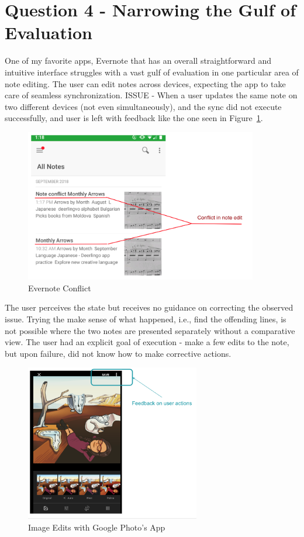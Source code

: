 \documentclass[12pt,letterpaper]{article}
\begin{document}
\section*{Question 4 - Narrowing the Gulf of Evaluation}
One of my favorite apps, Evernote \cite{evernote} that has an overall straightforward and intuitive interface struggles with a vast gulf of evaluation in one particular area of note editing. The user can edit notes across devices, expecting the app to take care of seamless synchronization. ISSUE - When a user updates the same note on two different devices (not even simultaneously), and the sync did not execute successfully, and user is left with feedback like the one seen in Figure~\ref{fig::5}. 

\begin{figure}[H]
\centering
\includegraphics[width=4in, scale=.4]{evernote.png}
\caption{Evernote Conflict}
\label{fig::5}
\end{figure}

The user perceives the state but receives no guidance on correcting the observed issue. Trying the make sense of what happened, i.e., find the offending lines, is not possible where the two notes are presented separately without a comparative view. The user had an explicit goal of execution - make a few edits to the note, but upon failure, did not know how to make corrective actions.

\begin{figure}[H]
\centering
\includegraphics[width=3in, scale=.3]{photo.png}
\caption{Image Edits with Google Photo's App}
\label{fig::6}
\end{figure}
\end{document}
